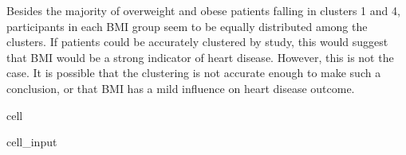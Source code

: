 \documentclass[letterpaper,10pt,english]{jupyterBook}
\begin{document}
\sphinxAtStartPar
Besides the majority of overweight and obese patients falling in clusters 1 and 4, participants in each BMI group seem to be equally distributed among the clusters. If patients  could be accurately clustered by study, this would suggest that BMI would be a strong indicator of heart disease. However, this is not the case. It is possible that the clustering is not accurate enough to make such a conclusion, or that BMI has a mild influence on heart disease outcome.

\begin{sphinxuseclass}{cell}\begin{sphinxVerbatimInput}

\begin{sphinxuseclass}{cell_input}
\begin{sphinxVerbatim}[commandchars=\\\{\}]
    
    


\end{sphinxVerbatim}
\end{sphinxuseclass}
\end{sphinxVerbatimInput}
\end{sphinxuseclass}
\end{document}
